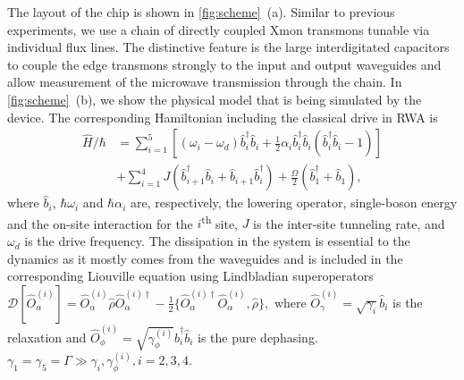 \documentclass[%
 aps, pra,
 amsmath,amssymb,
 reprint,%
superscriptaddress
]{revtex4-2}
\begin{document}
The layout of the chip is shown in \autoref{fig:scheme}~(a). Similar to previous experiments, we use a chain of directly coupled Xmon transmons tunable via individual flux lines. The distinctive feature is the large interdigitated capacitors to couple the edge transmons strongly to the input and output waveguides and allow measurement of the microwave transmission through the chain. In \autoref{fig:scheme}~(b), we show the physical model that is being simulated by the device. The corresponding Hamiltonian including the classical drive in RWA is
\begin{equation}
\begin{aligned}
\hat H/\hbar &= \sum_{i=1}^5\left[ (\omega_i - \omega_d) \hat b^\dag_i \hat b_i + \frac{1}{2} \alpha_i \hat b_i^\dag \hat b_i (\hat b^\dag_i \hat b_i - 1)\right]\\
&+\sum_{i=1}^4 J (\hat b^\dag_{i+1} \hat b_i + \hat b_{i+1} \hat b_i^\dag)+\frac{\Omega}{2}(\hat b_1^\dag + \hat b_1),
\end{aligned}\label{eq:bose-hubbard}
\end{equation} 
where $\hat b_i$, $\hbar \omega_i$ and $\hbar\alpha_i$ are, respectively, the lowering operator, single-boson energy and the on-site interaction for the $i$\textsuperscript{th} site, $J$ is the inter-site tunneling rate, and $\omega_d$ is the drive frequency. The dissipation in the system is essential to the dynamics as it mostly comes from the waveguides and is included in the corresponding Liouville equation using Lindbladian superoperators $\mathcal D[\hat{O}^{(i)}_\alpha] = \hat{O}^{(i)}_\alpha \hat \rho \hat{O}^{(i)\dag}_\alpha - \frac{1}{2}\{\hat{O}^{(i)\dag}_\alpha \hat{O}^{(i)}_\alpha, \hat \rho\},$ where $\hat{O}^{(i)}_\gamma = \sqrt{\gamma_i} \hat b_i$ is the relaxation and $\hat{O}^{(i)}_\phi = \sqrt{\gamma^{(i)}_\phi} \hat b_i^\dag \hat b_i$ is the pure dephasing. $\gamma_1 = \gamma_5 = \Gamma \gg \gamma_i, \gamma_\phi^{(i)}, i=2,3,4$.
\end{document}
